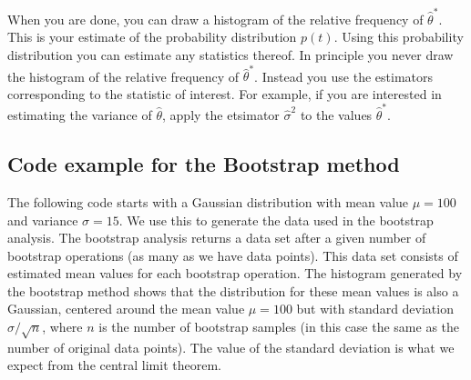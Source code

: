 \documentclass[%
oneside,                 %
final,                   %
10pt]{article}
\begin{document}
\noindent
When you are done, you can draw a histogram of the relative frequency of $\widehat \theta^*$. This is your estimate of the probability distribution $p(t)$. Using this probability distribution you can estimate any statistics thereof. In principle you never draw the histogram of the relative frequency of $\widehat{\theta}^*$. Instead you use the estimators corresponding to the statistic of interest. For example, if you are interested in estimating the variance of $\widehat \theta$, apply the etsimator $\widehat \sigma^2$ to the values $\widehat \theta ^*$.

\subsection*{Code example for the Bootstrap method}

The following code starts with a Gaussian distribution with mean value $\mu =100$ and variance $\sigma=15$. We use this to generate the data used in the bootstrap analysis. The bootstrap analysis returns a data set after a given number of bootstrap operations (as many as we have data points). This data set consists of estimated mean values for each bootstrap operation. The histogram generated by the bootstrap method shows that the distribution for these mean values is also a Gaussian, centered around the mean value $\mu=100$ but with standard deviation $\sigma/\sqrt{n}$, where $n$ is the number of bootstrap samples (in this case the same as the number of original data points). The value of the standard deviation is what we expect from the central limit theorem. 
\end{document}
